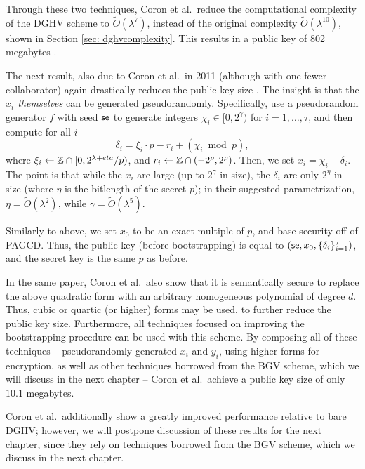     Through these two techniques, Coron et al.~reduce the computational complexity of the DGHV scheme to $\widetilde{O}(\lambda^7)$, instead of the original complexity $\widetilde{O}(\lambda^{10})$, shown in Section \ref{sec: dghvcomplexity}. This results in a public key of 802 megabytes \cite{Coron2011}.

    The next result, also due to Coron et al.~in 2011 (although with one fewer collaborator) again drastically reduces the public key size \cite{Coron2012}. The insight is that the \emph{$x_i$ themselves} can be generated pseudorandomly. Specifically, use a pseudorandom generator $f$ with seed ${\sf se}$ to generate integers $\chi_i \in [0, 2^{\gamma})$ for $i = 1, \dots, \tau$, and then compute for all $i$
    \[\delta_i = \xi_i \cdot p - r_i + (\chi_i \bmod p),\]
    where $\xi_i \leftarrow \mathbb{Z} \cap [0, 2^{\lambda + eta} / p)$, and $r_i \leftarrow \mathbb{Z} \cap (-2^{\rho}, 2^\rho)$. Then, we set $x_i = \chi_i - \delta_i$. The point is that while the $x_i$ are large (up to $2^\gamma$ in size), the $\delta_i$ are only $2^\eta$ in size (where $\eta$ is the bitlength of the secret $p$); in their suggested parametrization, $\eta = \widetilde{O}(\lambda^2)$, while $\gamma = \widetilde{O}(\lambda^5)$.

    Similarly to above, we set $x_0$ to be an exact multiple of $p$, and base security off of PAGCD. Thus, the public key (before bootstrapping) is equal to $({\sf se}, x_0, \{\delta_i\}_{i = 1}^\tau)$, and the secret key is the same $p$ as before.

    In the same paper, Coron et al.~also show that it is semantically secure to replace the above quadratic form with an arbitrary homogeneous polynomial of degree $d$. Thus, cubic or quartic (or higher) forms may be used, to further reduce the public key size. Furthermore, all techniques focused on improving the bootstrapping procedure can be used with this scheme. By composing all of these techniques -- pseudorandomly generated $x_i$ and $y_i$, using higher forms for encryption, as well as other techniques borrowed from the BGV scheme, which we will discuss in the next chapter -- Coron et al.~achieve a public key size of only $10.1$ megabytes. \cite{Coron2012}

    Coron et al.~additionally show a greatly improved performance relative to bare DGHV; however, we will postpone discussion of these results for the next chapter, since they rely on techniques borrowed from the BGV scheme, which we discuss in the next chapter.



